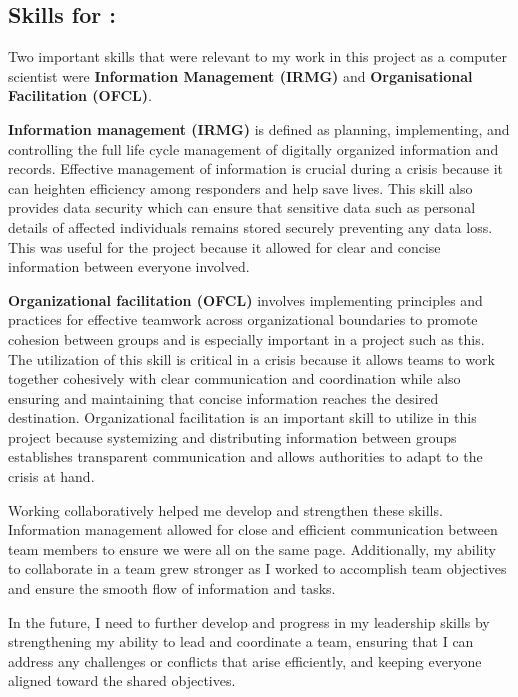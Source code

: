 \documentclass[a4paper, 11pt]{report}
\begin{document}
\subsection{Skills for \majA: \studA}

Two important skills that were relevant to my work in this project as a computer scientist were \textbf{Information Management (IRMG)} and \textbf{Organisational Facilitation (OFCL)}.\newline

\textbf{Information management (IRMG)}  is defined as planning, implementing, and controlling the full life cycle management of digitally organized information and records. Effective management of information is crucial during a crisis because it can heighten efficiency among responders and help save lives. This skill also provides data security which can ensure that sensitive data such as personal details of affected individuals remains stored securely preventing any data loss. This was useful for the project because it allowed for clear and concise information between everyone involved.\newline

\textbf{Organizational facilitation (OFCL)} involves implementing principles and practices for effective teamwork across organizational boundaries to promote cohesion between groups and is especially important in a project such as this. The utilization of this skill is critical in a crisis because it allows teams to work together cohesively with clear communication and coordination while also ensuring and maintaining that concise information reaches the desired destination. Organizational facilitation is an important skill to utilize in this project because systemizing and distributing information between groups establishes transparent communication and allows authorities to adapt to the crisis at hand.\newline

Working collaboratively helped me develop and strengthen these skills. Information management allowed for close and efficient communication between team members to ensure we were all on the same page. Additionally, my ability to collaborate in a team grew stronger as I worked to accomplish team objectives and ensure the smooth flow of information and tasks.\newline

In the future, I need to further develop and progress in my leadership skills by strengthening my ability to lead and coordinate a team, ensuring that I can address any challenges or conflicts that arise efficiently, and keeping everyone aligned toward the shared objectives.\newline
\end{document}
